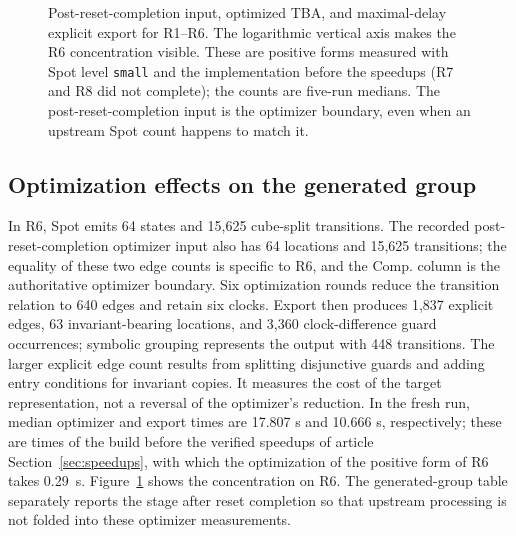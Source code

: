 



\begin{figure}[t]
\centering

\caption{Post-reset-completion input, optimized TBA, and maximal-delay
explicit export for R1--R6. The logarithmic vertical axis makes the R6
concentration visible. These are positive forms measured with Spot level \texttt{small} and the implementation before the speedups (R7 and R8 did not complete); the counts are five-run medians. The post-reset-completion input is the optimizer boundary, even when an upstream Spot count happens to match it.}
\label{fig:R-transition-counts}
\end{figure}

\subsection{Optimization effects on the generated group}
In R6, Spot emits 64 states and 15,625 cube-split transitions. The recorded
post-reset-completion optimizer input also has 64 locations and 15,625
transitions; the equality of these two edge counts is specific to R6, and the
Comp. column is the authoritative optimizer boundary. Six optimization
rounds reduce the transition relation to 640 edges and retain six clocks.
Export then produces 1,837 explicit edges, 63 invariant-bearing locations,
and 3,360 clock-difference guard occurrences; symbolic grouping represents
the output with 448 transitions. The larger explicit edge count results from
splitting disjunctive guards and adding entry conditions for invariant copies.
It measures the cost of the target representation, not a reversal of the
optimizer's reduction. In the fresh run, median optimizer and export times
are 17.807 s and 10.666 s, respectively; these are times of the build before the verified speedups of article Section~\ref{sec:speedups}, with which the optimization of the positive form of R6 takes 0.29~s. Figure~\ref{fig:R-transition-counts} shows the concentration on R6. The generated-group table separately reports the
stage after reset completion so that upstream processing is not folded into
these optimizer measurements.

